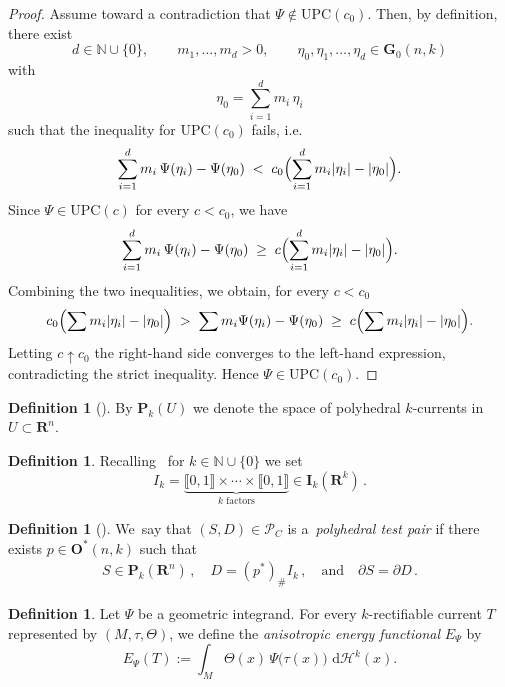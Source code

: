 \documentclass[a4paper,twoside,reqno]{article}
\theoremstyle{definition}
\theoremstyle{remark}
\theoremstyle{plain}
\theoremstyle{remark}
\theoremstyle{definition}
\newtheorem{definition}[theorem]{Definition}
\newcommand{\ograss}[2]{\mathbf{G}_0(#1,#2)}
\newcommand{\PC}[1]{\mathbf{P}_{#1}}
\newcommand{\IC}{\mathbf{I}}
\newcommand{\natp}{\mathbb{N}}
\newcommand{\nat}{\natp \cup \{0\}}
\newcommand{\UPC}{\mathrm{UPC}}
\newcommand{\R}{\mathbf{R}}
\newcommand{\HM}{\mathscr{H}}
\newcommand{\ud}{\ensuremath{\,\mathrm{d}}}
\newcommand{\Lbrack}{\llbracket}
\newcommand{\Rbrack}{\rrbracket}
\newcommand{\orthproj}[2]{\mathbf{O}^\ast({#1},{#2})}
\begin{document}
\begin{proof}
    Assume toward a contradiction that $\Psi\notin\UPC(c_0)$.  
    Then, by definition, there exist
    \[
        d\in\nat,\qquad m_1,\ldots,m_d>0,\qquad
        \eta_0,\eta_1,\ldots,\eta_d\in\ograss nk
    \]
    with
    \[
        \eta_0=\sum_{i=1}^d m_i\,\eta_i
    \]
    such that the inequality for $\UPC(c_0)$ fails, i.e.
    \[
        \sum_{i=1}^d m_i\,\Psi(\eta_i)-\Psi(\eta_0)
        \;<\;
        c_0\Bigl(\sum_{i=1}^d m_i|\eta_i|-|\eta_0|\Bigr).
    \]
    Since $\Psi\in\UPC(c)$ for every $c<c_0$, we have
    \[
        \sum_{i=1}^d m_i\,\Psi(\eta_i)-\Psi(\eta_0)
        \;\ge\;
        c\Bigl(\sum_{i=1}^d m_i|\eta_i|-|\eta_0|\Bigr).
    \]
    Combining the two inequalities, we obtain, for every $c<c_0$
    \[
        c_0\Bigl(\sum m_i|\eta_i|-|\eta_0|\Bigr)
        \;>\;
        \sum m_i\Psi(\eta_i)-\Psi(\eta_0)
        \;\ge\;
        c\Bigl(\sum m_i|\eta_i|-|\eta_0|\Bigr).
    \]
    Letting $c\uparrow c_0$ the right-hand side converges to the left-hand 
    expression, contradicting the strict inequality. Hence 
    $\Psi\in\UPC(c_0)$.
\end{proof}

\begin{definition}[]
    By $\PC{k}(U)$ we denote the space of polyhedral $k$-currents in 
    $U \subset \R^n$.
\end{definition}

\begin{definition}
    Recalling~\cite[4.1.8 and 4.1.32]{Federer1969} for $k \in \nat$ we set
    \[
        I_k = \underbrace{\Lbrack 0, 1 \Rbrack \times \cdots \times \Lbrack 0, 1 
        \Rbrack}_{\text{$k$ factors}} \in \IC_k(\R^k) \,.
    \]
\end{definition}

\begin{definition}[]
    \label{def:polyhedral_test_pairs}
    We~say that $(S, D) \in \mathcal{P}_C$ is a~\emph{polyhedral test pair} if
    there exists $p \in \orthproj nk$ such that
    \begin{gather*}
        S \in \PC{k}(\R^n) \,,
        \quad
        D = (p^*)_{\#} I_k \,,
        \quad \text{and} \quad
        \partial S = \partial D  \,.
    \end{gather*}
\end{definition}

\begin{definition}
    Let $\Psi$ be a geometric integrand.
    For every $k$-rectifiable current $T$ represented by $(M,\tau,\Theta)$,
    we define the \emph{anisotropic energy functional} $E_{\Psi}$ by
    \[
        E_{\Psi}(T)
        := \int_M \Theta(x)\,\Psi\bigl(\tau(x)\bigr)\,\ud\HM^k(x).
    \]
\end{definition}
\end{document}
